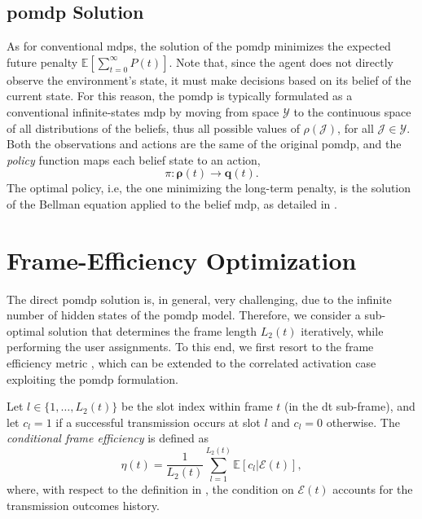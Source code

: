 \documentclass[conference]{IEEEtran}
\begin{document}
\subsection{\ac{pomdp} Solution}
As for conventional \acp{mdp}, the solution of the \ac{pomdp} minimizes the expected future penalty $\mathbb{E}\left[\sum _{t=0}^{\infty }P(t)\right]$. Note that, since the agent does not directly observe the environment's state, it must make decisions based on its belief of the current state.
For this reason, the \ac{pomdp} is typically formulated as a conventional infinite-states \ac{mdp} by moving from space $\mathcal{Y}$ to the continuous space of all distributions of the beliefs, thus all possible values of $\rho(\bm{\mathcal{J}})$, for all $\bm{\mathcal{J}} \in \mathcal{Y}$.
Both the observations and actions are the same of the original \ac{pomdp}, and the \textit{policy} function maps each belief state to an action,
\begin{equation}
\pi: \bm{\rho}(t) \rightarrow \bm{q}(t).
\end{equation}
The optimal policy, i.e, the one minimizing the long-term penalty, is the solution of the Bellman equation applied to the belief \ac{mdp}, as detailed in \cite{Kaelbling98}.

\section{Frame-Efficiency Optimization}\label{sec:frameeff}
The direct \ac{pomdp} solution is, in general, very challenging, due to the infinite number of hidden states of the \ac{pomdp} model. Therefore, we consider a sub-optimal solution that determines the frame length $L_2(t)$ iteratively, while performing the user assignments. 
To this end, we first resort to the frame efficiency metric \cite{rech2023partial}, which can be extended to the correlated activation case exploiting the \ac{pomdp} formulation.

Let $l \in \{1,\ldots, L_2(t)\}$ be the slot index within frame $t$ (in the \ac{dt} sub-frame), and let $c_l = 1$ if a successful transmission occurs at slot $l$ and $c_l = 0$ otherwise.
The \textit{conditional frame efficiency} is defined as 
\begin{equation}\label{frameeff}
    \eta(t) = \frac{1}{L_2(t)}\sum_{l=1}^{L_2(t)}\mathbb{E}[c_l|\mathcal{E}(t)], 
\end{equation}
where, with respect to the definition in \cite{rech2023partial}, the condition on $\mathcal{E}(t)$ accounts for the transmission outcomes history.
\end{document}
